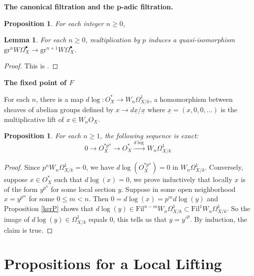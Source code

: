 \documentclass[a4paper,12pt,twoside]{report}
\newtheorem{proposition}[theorem]{Proposition}
\newtheorem{lemma}[theorem]{Lemma}
\newcommand{\Fil}{\mathrm{Fil}}
\newcommand{\gr}{\mathrm{gr}}
\begin{document}
\begin{appendices}
    \medskip 

    {\bf The canonical filtration and the p-adic filtration.}

    \begin{proposition}
        For each integer $n\geq 0$, 
    \end{proposition}

    \begin{lemma}\label{quasiisop}
        For each $n\geqslant 0$, multiplication by $p$ induces a quasi-isomorphism
        $\gr^nW\Omega_X^\bullet \rightarrow \gr^{n+1}W\Omega_X^\bullet$.
    \end{lemma}
    \begin{proof}
        This is \cite[Proposition I.3.13]{Il1}.
    \end{proof}  

    \medskip
    {\bf The fixed point of $F$}

    For each $n$, there is a map $d\log:O_X^* \rightarrow W_n\Omega^1_{X/k}$, 
    a homomorphism between sheaves of abelian groups defined by $x\rightarrow d\underline{x}/\underline{x}$
    where $\underline{x}=(x,0,0,...)$ is the multiplicative lift of $x\in W_nO_X$. 

    \begin{proposition}\label{GmWOmega1log}
        For each $n\geq 1$, the following sequence is exact: 
        \[0\rightarrow O_X^{*p^n} \rightarrow O_X^* \xrightarrow[]{d\log} W_n\Omega_{X/k}^1\]
    \end{proposition}

\begin{proof}
    Since $p^nW_n\Omega^1_{X/k}=0$, we have $d\log (O_X^{*p^n})=0$ in $W_n\Omega_{X/k}^1$. 
    Conversely, suppose $x\in O_X^*$ such that $d\log(x)=0$, we prove inductively that locally $x$ is of the form 
    $y^{p^n}$ for some local section $y$. 
    Suppose in some open neighborhood $x=y^{p^m}$ for some $0\leqslant m< n$. 
    Then $0=d\log(x)=p^md\log(y)$ and Proposition \ref{kerP} 
    shows that $d\log(y)\in \Fil^{n-m}W_n\Omega^1_{X/k}\subset \Fil^1W_n\Omega^1_{X/k}$.
    So the image of $d\log(y)\in \Omega^1_{X/k}$ equals $0$, this tells us that $y=y'^p$. 
    By induction, the claim is true. 
\end{proof}

    \chapter{Propositions for a Local Lifting}


\end{appendices}
\end{document}
